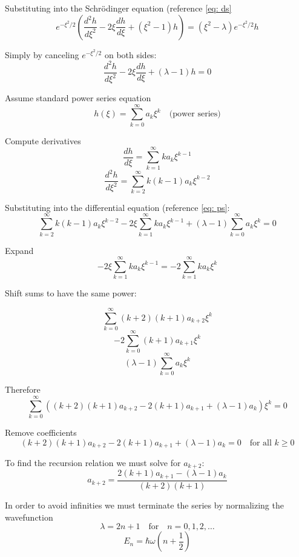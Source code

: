 \documentclass[12pt]{article}
\begin{document}
        Substituting into the Schrödinger equation (reference \ref{eq: ds}
        \[
            e^{-\xi^2/2} \left( \frac{d^2 h}{d\xi^2} - 2\xi \frac{dh}{d\xi} + (\xi^2 - 1)h \right) = (\xi^2 - \lambda) e^{-\xi^2/2} h
        \]

        Simply by canceling \( e^{-\xi^2/2} \) on both sides:
        \[
            \frac{d^2 h}{d\xi^2} - 2\xi \frac{dh}{d\xi} + (\lambda - 1)h = 0
        \]

        Assume standard power series equation
        \begin{equation} \label{eq: ps}
            h(\xi) = \sum_{k=0}^{\infty} a_k \xi^k \quad \text{(power series)}    
        \end{equation}

        Compute derivatives
        \[
            \frac{dh}{d\xi} = \sum_{k=1}^{\infty} k a_k \xi^{k-1}
        \]
        \[
            \frac{d^2h}{d\xi^2} = \sum_{k=2}^{\infty} k(k-1) a_k \xi^{k-2}
        \]

        Substituting into the differential equation (reference \ref{eq: ps}:
        \[
            \sum_{k=2}^{\infty} k(k-1) a_k \xi^{k-2} - 2\xi \sum_{k=1}^{\infty} k a_k \xi^{k-1} + (\lambda-1) \sum_{k=0}^{\infty} a_k \xi^k = 0
        \]

        Expand
        \[
            -2\xi \sum_{k=1}^{\infty} k a_k \xi^{k-1} = -2 \sum_{k=1}^{\infty} k a_k \xi^k
        \]

        Shift sums to have the same power:

        \[
            \sum_{k=0}^{\infty} (k+2)(k+1) a_{k+2} \xi^k
        \]
        \[
            -2 \sum_{k=0}^{\infty} (k+1) a_{k+1} \xi^k
        \]
        \[
            (\lambda-1) \sum_{k=0}^{\infty} a_k \xi^k
        \]

        Therefore
        \[
            \sum_{k=0}^{\infty} \left( (k+2)(k+1)a_{k+2} - 2(k+1)a_{k+1} + (\lambda-1)a_k \right) \xi^k = 0
        \]

        Remove coefficients
        \[
            (k+2)(k+1)a_{k+2} - 2(k+1)a_{k+1} + (\lambda-1)a_k = 0 \quad \text{for all } k \geq 0
        \]
        
        To find the recursion relation we must solve for \( a_{k+2} \):
        \[
            a_{k+2} = \frac{2(k+1)a_{k+1} - (\lambda-1)a_k}{(k+2)(k+1)}
        \]

        In order to avoid infinities we must terminate the series by normalizing the wavefunction
        \[
            \lambda = 2n + 1 \quad \text{for} \quad n = 0, 1, 2, \dots
        \]
        \[
            E_n = \hbar\omega \left( n + \frac{1}{2} \right)
        \]
        
\end{document}
